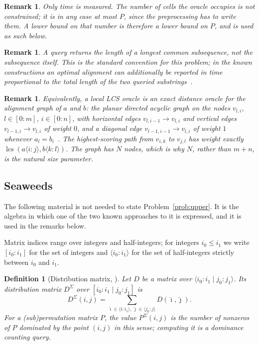 \documentclass[10pt]{article}
\newtheorem{definition}{Definition}
\newtheorem{remark}[theorem]{Remark}
\newcommand{\lcs}{\operatorname{lcs}}
\begin{document}
\begin{remark}\label{rem:timeonly}
Only time is measured. The number of cells the oracle occupies is not
constrained; it is in any case at most $P$, since the preprocessing has to
write them. A lower bound on that number is therefore a lower bound on $P$,
and is used as such below.
\end{remark}

\begin{remark}
A query returns the \emph{length} of a longest common subsequence, not the
subsequence itself. This is the standard convention for this problem; in the
known constructions an optimal alignment can additionally be reported in time
proportional to the total length of the two queried substrings~\cite[Remark
13]{CGMW21}.
\end{remark}

\begin{remark}\label{rem:planar}
Equivalently, a local LCS oracle is an exact distance oracle for the
\emph{alignment graph} of $a$ and $b$: the planar directed acyclic graph on the
nodes $v_{l,i}$, $l\in[0:m]$, $i\in[0:n]$, with horizontal edges
$v_{l,i-1}\to v_{l,i}$ and vertical edges $v_{l-1,i}\to v_{l,i}$ of weight $0$,
and a diagonal edge $v_{l-1,i-1}\to v_{l,i}$ of weight $1$ whenever
$a_l=b_i$~\cite[Definitions 4.4, 4.5]{TiskinArXiv}. The highest-scoring path
from $v_{i,k}$ to $v_{j,l}$ has weight exactly
$\lcs(a\langle i:j\rangle,b\langle k:l\rangle)$. The graph has $N$ nodes, which
is why $N$, rather than $m+n$, is the natural size parameter.
\end{remark}

\subsection{Seaweeds}\label{sec:seaweeds}

The following material is not needed to state Problem~\ref{prob:upper}. It is
the algebra in which one of the two known approaches to it is expressed, and it
is used in the remarks below.

Matrix indices range over integers and half-integers; for integers
$i_0\le i_1$ we write $[i_0:i_1]$ for the set of integers and
$\langle i_0:i_1\rangle$ for the set of half-integers strictly between $i_0$
and $i_1$.

\begin{definition}[Distribution matrix, {\cite[Definition 2.1]{TiskinArXiv}}]
Let $D$ be a matrix over $\langle i_0:i_1\mid j_0:j_1\rangle$. Its
\emph{distribution matrix} $D^{\Sigma}$ over $[i_0:i_1\mid j_0:j_1]$ is
\[
D^{\Sigma}(i,j)=\sum_{\hat\imath\in\langle i:i_1\rangle,\ \hat\jmath\in\langle j_0:j\rangle}D(\hat\imath,\hat\jmath).
\]
For a (sub)permutation matrix $P$, the value $P^{\Sigma}(i,j)$ is the number of
nonzeros of $P$ dominated by the point $(i,j)$ in this sense; computing it is a
\emph{dominance counting} query.
\end{definition}
\end{document}
